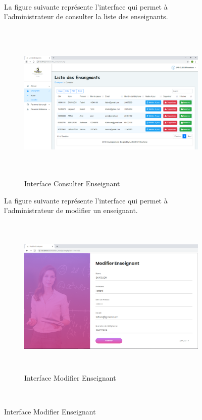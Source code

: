 \documentclass[12 pt]{report}
\begin{document}
\begin{figure}[h]
\begin{center}
\begin{figure}[h]
\begin{center}
\end{center}
\end{figure} \\
La figure suivante représente l'interface qui permet à l'administrateur de consulter la liste des enseignants.
\begin{figure}[h]
 \begin{center}
\includegraphics[width= 18 cm ,height=  7.75cm]{consulter_enseignant.PNG}
\caption{Interface Consulter Enseignant}

\end{center}
\end{figure}  
\newpage
La figure suivante représente l'interface qui permet à l'administrateur de modifier un enseignant.
\begin{figure}[h]
 \begin{center}
\includegraphics[width= 18 cm ,height=  7.75cm]{modifier_enseignant.PNG}
\caption{Interface Modifier Enseignant}

\end{center}
\end{figure}\\


\end{center}
\end{figure}
\end{document}
